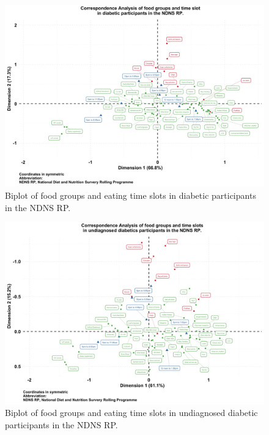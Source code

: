\documentclass[utf8]{frontiersSCNS}
\begin{document}
\begin{landscape}
\begin{figure}[!ht]
\begin{center}
\includegraphics[width=21.5cm]{Fig3.jpg}
\end{center}
\caption{Biplot of food groups and eating time slots in diabetic participants in the NDNS RP.}\label{fig:fig3}
\end{figure}

\begin{figure}[!ht]
\begin{center}
\includegraphics[width=21.5cm]{Fig4.jpg}
\end{center}
\caption{Biplot of food groups and eating time slots in undiagnosed diabetic participants in the NDNS RP.}\label{fig:fig4}
\end{figure}


\end{landscape}
\end{document}
